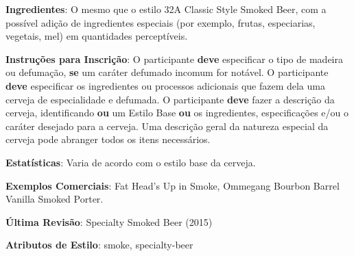 \textbf{Ingredientes}: O mesmo que o estilo 32A Classic Style Smoked Beer, com a possível adição de ingredientes especiais (por exemplo, frutas, especiarias, vegetais, mel) em quantidades perceptíveis.

\textbf{Instruções para Inscrição}: O participante \textbf{deve} especificar o tipo de madeira ou defumação, \textbf{se} um caráter defumado incomum for notável. O participante \textbf{deve} especificar os ingredientes ou processos adicionais que fazem dela uma cerveja de especialidade e defumada. O participante \textbf{deve} fazer a descrição da cerveja, identificando \textbf{ou} um Estilo Base \textbf{ou} os ingredientes, especificações e/ou o caráter desejado para a cerveja. Uma descrição geral da natureza especial da cerveja pode abranger todos os itens necessários.

\textbf{Estatísticas}: Varia de acordo com o estilo base da cerveja.

\textbf{Exemplos Comerciais}: Fat Head’s Up in Smoke, Ommegang Bourbon Barrel Vanilla Smoked Porter.

\textbf{Última Revisão}: Specialty Smoked Beer (2015)

\textbf{Atributos de Estilo}: smoke, specialty-beer
